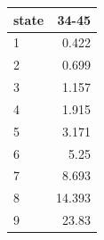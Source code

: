 \begin{tabular}{lr}
\toprule
state & 34-45 \\
\midrule
1 & 0.422 \\
2 & 0.699 \\
3 & 1.157 \\
4 & 1.915 \\
5 & 3.171 \\
6 & 5.25 \\
7 & 8.693 \\
8 & 14.393 \\
9 & 23.83 \\
\bottomrule
\end{tabular}
